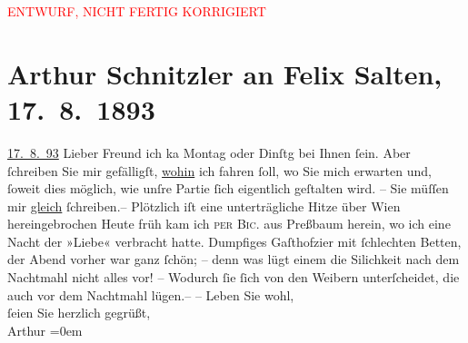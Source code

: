 
\begin{center}
            \textcolor{red}{ENTWURF, NICHT FERTIG KORRIGIERT}
                      \end{center}
            
         
         \renewcommand{\erwaehntePersonen}{Personen: Felix Salten}
         \renewcommand{\erwaehnteOrte}{Orte: Dölsach, Pressbaum, Wien}
         \renewcommand{\erwaehnteWerke}{}
               \section[Arthur Schnitzler an Felix Salten, 17. 8. 1893]{ Arthur Schnitzler an Felix Salten, 17. 8. 1893}\nopagebreak{}\rehead{ }\begin{ledgroupsized}[t]{13cm}\normalsize\beginnumbering \toendnotes[C]{\smallbreak\pagebreak[2]} 
\pstart
           \raggedleft{}{\pb}\uline{17. 8. 93}\pend
           \pstart{}Lieber Freund\pend\pstart
           ich ka{\geminationn}{ }Montag oder Dinſtg bei Ihnen ſein. Aber ſchreiben Sie mir
               gefälligſt, \uline{wohin} ich fahren ſoll, wo Sie mich
               erwarten {\pb}und, ſoweit dies möglich, wie unſre
               Partie ſich eigentlich geſtalten wird. –\pend
           \pstart
           Sie müſſen mir \uline{gleich} ſchreiben.–\pend
           \pstart
           Plötzlich iſt eine unterträgliche Hitze über Wien
               hereingebrochen {\pb}Heute früh kam ich \textsc{per}{ }\textsc{Bic.} aus Preßbaum
               herein, wo ich eine Nacht der »Liebe« verbracht hatte. Dumpfiges Gaſthofzi{\geminationm}er mit ſchlechten Betten, der Abend vorher war ganz
               ſchön; – denn was lügt einem die Si{\geminationn}lichkeit nach dem
                  {\pb}Nachtmahl \introOben{}nicht\introOben{}
               alles vor! \pend
           \pstart
           – Wodurch ſie ſich von den Weibern unterſcheidet, die auch vor dem Nachtmahl lügen.– \pend
           \pstart
           – Leben Sie wohl, {\\[\baselineskip]}ſeien Sie herzlich gegrüßt, {\\[\baselineskip]}\spacefill\mbox{Arthur}\pend
           \leftskip=0em{}
         
         \endnumbering{}\end{ledgroupsized}\begin{anhang}\end{anhang}\newcommand{\dateiname}{L02961}\newcommand{\titel}{Arthur Schnitzler an Felix Salten, 17. 8. 1893}\newcommand{\editorInnen}{Martin Anton Müller und Laura Untner}
      